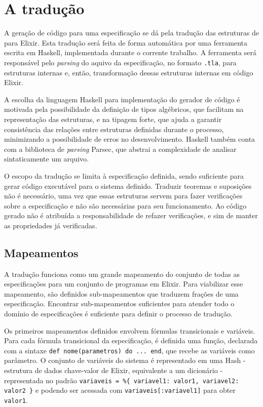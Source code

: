 \section{A tradução}
\label{traducao}

A geração de código para uma especificação se dá pela tradução das estruturas de \TLA para Elixir. Esta tradução será feita de forma automática por uma ferramenta escrita em Haskell, implementada durante o corrente trabalho. A ferramenta será responsável pelo \textit{parsing} do aquivo da especificação, no formato \texttt{.tla}, para estruturas internas e, então, transformação dessas estruturas internas em código Elixir.

A escolha da linguagem Haskell para implementação do gerador de código é motivada pela possibilidade da definição de tipos algébricos, que facilitam na representação das estruturas, e na tipagem forte, que ajuda a garantir consistência das relações entre estruturas definidas durante o processo, minimizando a possibilidade de erros no desenvolvimento. Haskell também conta com a biblioteca de \textit{parsing} Parsec, que abstrai a complexidade de analisar sintaticamente um arquivo.

O escopo da tradução se limita à especificação definida, sendo suficiente para gerar código executável para o sistema definido. Traduzir teoremas e suposições não é necessário, uma vez que essas estruturas servem para fazer verificações sobre a especificação e não são necessárias para seu funcionamento. Ao código gerado não é atribuída a responsabilidade de refazer verificações, e sim de manter as propriedades já verificadas.

\subsection{Mapeamentos}
\label{mapeamentos}

A tradução funciona como um grande mapeamento do conjunto de todas as especificações para um conjunto de programas em Elixir. Para viabilizar esse mapeamento, são definidos sub-mapeamentos que traduzem frações de uma especificação. Encontrar sub-mapeamentos suficientes para atender todo o domínio de especificações é suficiente para definir o processo de tradução.

Os primeiros mapeamentos definidos envolvem fórmulas transicionais e variáveis. Para cada fórmula transicional da especificação, é definida uma função, declarada com a sintaxe \texttt{def nome(parametros) do ... end}, que recebe as variáveis como parâmetro. O conjunto de variáveis do sistema é representado em uma Hash - estrutura de dados chave-valor de Elixir, equivalente a um dicionário - representada no padrão \texttt{variaveis = \%\{ variavel1: valor1, variavel2: valor2 \}} e podendo ser acessada com \texttt{variaveis[:variavel1]} para obter \texttt{valor1}.

